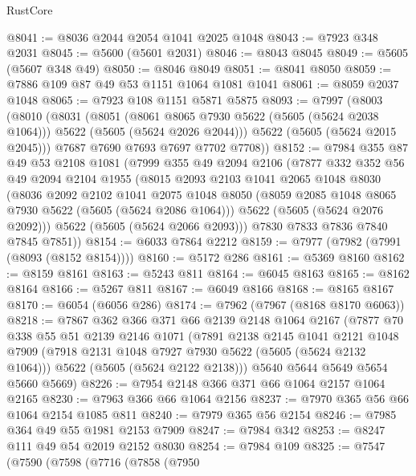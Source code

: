 \begin{lexlean}{RustCore}
\begin{coremodule}
@8041 := @8036 @2044 @2054 @1041 @2025 @1048
@8043 := @7923 @348 @2031
@8045 := @5600 (@5601 @2031)
@8046 := @8043 @8045
@8049 := @5605 (@5607 @348 @49)
@8050 := @8046 @8049
@8051 := @8041 @8050
@8059 := @7886 @109 @87 @49 @53 @1151 @1064 @1081 @1041
@8061 := @8059 @2037 @1048
@8065 := @7923 @108 @1151 @5871 @5875
@8093 := @7997
    (@8003
      (@8010
        (@8031
          (@8051
            (@8061 @8065 @7930 @5622 (@5605 (@5624 @2038 @1064)))
            @5622
            (@5605 (@5624 @2026 @2044)))
          @5622
          (@5605 (@5624 @2015 @2045)))
        @7687
        @7690
        @7693
        @7697
        @7702
        @7708))
@8152 := @7984
    @355
    @87
    @49
    @53
    @2108
    @1081
    (@7999
      @355
      @49
      @2094
      @2106
      (@7877
        @332
        @352
        @56
        @49
        @2094
        @2104
        @1955
        (@8015
          @2093
          @2103
          @1041
          @2065
          @1048
          @8030
          (@8036
            @2092
            @2102
            @1041
            @2075
            @1048
            @8050
            (@8059 @2085 @1048 @8065 @7930 @5622 (@5605 (@5624 @2086 @1064)))
            @5622
            (@5605 (@5624 @2076 @2092)))
          @5622
          (@5605 (@5624 @2066 @2093)))
        @7830
        @7833
        @7836
        @7840
        @7845
        @7851))
@8154 := @6033 @7864 @2212
@8159 := @7977 (@7982 (@7991 (@8093 (@8152 @8154))))
@8160 := @5172 @286
@8161 := @5369 @8160
@8162 := @8159 @8161
@8163 := @5243 @811
@8164 := @6045 @8163
@8165 := @8162 @8164
@8166 := @5267 @811
@8167 := @6049 @8166
@8168 := @8165 @8167
@8170 := @6054 (@6056 @286)
@8174 := @7962 (@7967 (@8168 @8170 @6063))
@8218 := @7867
    @362
    @366
    @371
    @66
    @2139
    @2148
    @1064
    @2167
    (@7877
      @70
      @338
      @55
      @51
      @2139
      @2146
      @1071
      (@7891
        @2138
        @2145
        @1041
        @2121
        @1048
        @7909
        (@7918 @2131 @1048 @7927 @7930 @5622 (@5605 (@5624 @2132 @1064)))
        @5622
        (@5605 (@5624 @2122 @2138)))
      @5640
      @5644
      @5649
      @5654
      @5660
      @5669)
@8226 := @7954 @2148 @366 @371 @66 @1064 @2157 @1064 @2165
@8230 := @7963 @366 @66 @1064 @2156
@8237 := @7970 @365 @56 @66 @1064 @2154 @1085 @811
@8240 := @7979 @365 @56 @2154
@8246 := @7985 @364 @49 @55 @1981 @2153 @7909
@8247 := @7984 @342
@8253 := @8247 @111 @49 @54 @2019 @2152 @8030
@8254 := @7984 @109
@8325 := @7547
    (@7590
      (@7598
        (@7716
          (@7858
            (@7950

\end{coremodule}
\end{lexlean}
